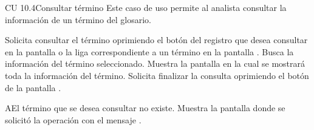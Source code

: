 \begin{UseCase}{CU 10.4}{Consultar término}
	{
		Este caso de uso permite al analista consultar la información de un término del glosario. 
	}
	
	

	


\end{UseCase}
 \begin{UCtrayectoria}
    \UCpaso[\UCactor] Solicita consultar el término oprimiendo el botón \btnConsulta del registro que desea consultar en la pantalla  o la liga correspondiente a un término en la pantalla .
    \UCpaso[\UCsist] Busca la información del término seleccionado. 
    \UCpaso[\UCsist] Muestra la pantalla  en la cual se mostrará toda la información del término.
    \UCpaso[\UCactor] Solicita finalizar la consulta oprimiendo el botón  de la pantalla .
 \end{UCtrayectoria}
 
 \begin{UCtrayectoriaA}{A}{El término que se desea consultar no existe.}
    \UCpaso[\UCsist] Muestra la pantalla donde se solicitó la operación con el mensaje .
 \end{UCtrayectoriaA} 
  